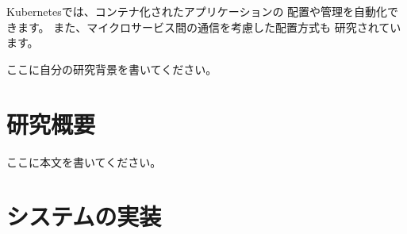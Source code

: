 \documentclass[no-page-number]{nanzan-abstract}
\begin{document}
Kubernetesでは、コンテナ化されたアプリケーションの
配置や管理を自動化できます\cite{kubernetes}。
また、マイクロサービス間の通信を考慮した配置方式も
研究されています\cite{marchese2022}。


ここに自分の研究背景を書いてください。


\section{研究概要}

%
%
%
%
%
%
%
%

ここに本文を書いてください。


%
%
%
%


\section{システムの実装}
\end{document}
